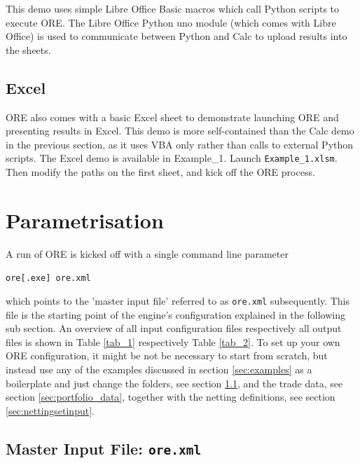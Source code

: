 \documentclass[12pt, a4paper]{article}
\begin{document}
This demo uses simple Libre Office Basic macros which call Python scripts to execute ORE. The Libre Office Python uno
module (which comes with Libre Office) is used to communicate between Python and Calc to upload results into the sheets.


\subsection{Excel}\label{sec:excel}

ORE also comes with a basic Excel sheet to demonstrate launching ORE and presenting results in Excel. This demo is more
self-contained than the Calc demo in the previous section, as it uses VBA only rather than calls to external Python
scripts. The Excel demo is available in Example\_1. Launch {\tt Example\_1.xlsm}. Then modify the paths on the first
sheet, and kick off the ORE process.

\section{Parametrisation}\label{sec:configuration}

A run of ORE is kicked off with a single command line parameter 

\medskip
\centerline{\tt ore[.exe] ore.xml}
\medskip

which points to the 'master input file' referred to  as {\tt ore.xml} subsequently. 
This file is the starting point of the engine's configuration explained in the following sub section.
An overview of all input configuration files respectively all output files is shown in Table \ref{tab_1} respectively Table \ref{tab_2}.
To set up your own ORE configuration, it might be not be necessary to start from scratch, but instead use any of the examples discussed in section \ref{sec:examples} as a boilerplate and just change the folders, see section \ref{sec:master_input}, and the trade data, see section \ref{sec:portfolio_data}, together with the netting definitions, see section \ref{sec:nettingsetinput}.

\subsection{Master Input File: {\tt ore.xml}}\label{sec:master_input}
\end{document}
